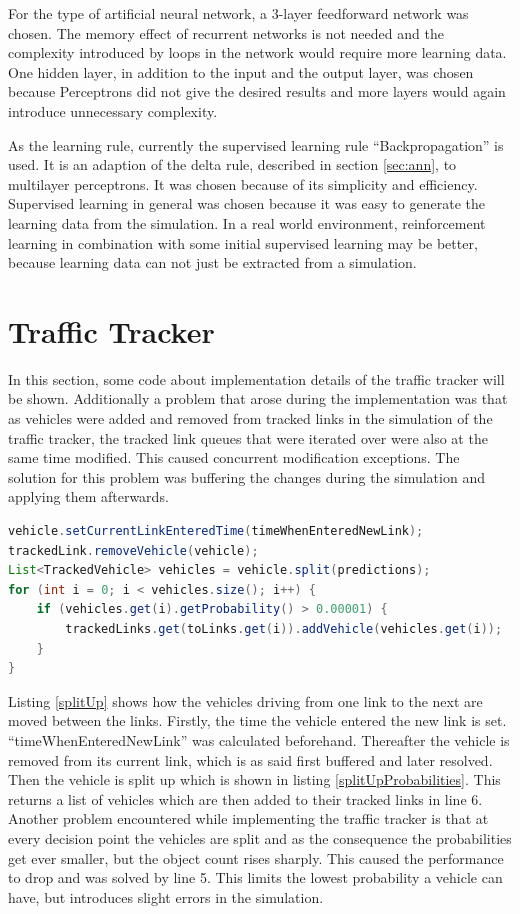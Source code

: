 For the type of artificial neural network, a 3-layer feedforward network was chosen. The memory effect of recurrent networks is not needed and the complexity introduced by loops in the network would require more learning data. One hidden layer, in addition to the input and the output layer, was chosen because Perceptrons did not give the desired results and more layers would again introduce unnecessary complexity.

As the learning rule, currently the supervised learning rule ``Backpropagation'' is used. It is an adaption of the delta rule, described in section \ref{sec:ann}, to multilayer perceptrons. It was chosen because of its simplicity and efficiency. Supervised learning in general was chosen because it was easy to generate the learning data from the simulation. In a real world environment, reinforcement learning in combination with some initial supervised learning may be better, because learning data can not just be extracted from a simulation.

\section{Traffic Tracker}

In this section, some code about implementation details of the traffic tracker will be shown. Additionally a problem that arose during the implementation was that as vehicles were added and removed from tracked links in the simulation of the traffic tracker, the tracked link queues that were iterated over were also at the same time modified. This caused concurrent modification exceptions. The solution for this problem was buffering the changes during the simulation and applying them afterwards.

\vspace{0.5em}

\begin{lstlisting}[caption={Split Up Vehicle to Multiple Links}, label=splitUp, language=Java]
vehicle.setCurrentLinkEnteredTime(timeWhenEnteredNewLink);
trackedLink.removeVehicle(vehicle);
List<TrackedVehicle> vehicles = vehicle.split(predictions);
for (int i = 0; i < vehicles.size(); i++) {
	if (vehicles.get(i).getProbability() > 0.00001) {
		trackedLinks.get(toLinks.get(i)).addVehicle(vehicles.get(i));
	}
}
\end{lstlisting}

Listing \ref{splitUp} shows how the vehicles driving from one link to the next are moved between the links. Firstly, the time the vehicle entered the new link is set. ``timeWhenEnteredNewLink'' was calculated beforehand. Thereafter the vehicle is removed from its current link, which is as said first buffered and later resolved. Then the vehicle is split up which is shown in listing \ref{splitUpProbabilities}. This returns a list of vehicles which are then added to their tracked links in line 6. Another problem encountered while implementing the traffic tracker is that at every decision point the vehicles are split and as the consequence the probabilities get ever smaller, but the object count rises sharply. This caused the performance to drop and was solved by line 5. This limits the lowest probability a vehicle can have, but introduces slight errors in the simulation.

